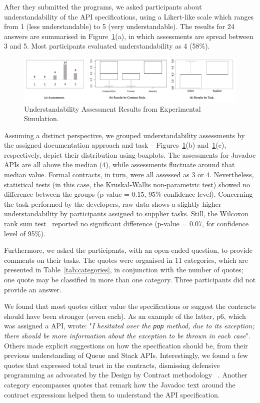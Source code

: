 After they submitted the programs, we asked participants about understandability of the API specifications, using a Likert-like scale which ranges from 1 (less understandable) to 5 (very understandable). The results for 24 answers are summarised in Figure~\ref{fig:expAll}(a), in which assessments are spread between 3 and 5. Most participants evaluated understandability as 4 (58\%).

\begin{figure}
\centering
\includegraphics[width=1\textwidth]{figs/expAllFig.png}
\caption{Understandability Assessment Results from Experimental Simulation.}
\label{fig:expAll}
\end{figure}

Assuming a distinct perspective, we grouped understandability assessments by the assigned documentation approach and task -- Figures~\ref{fig:expAll}(b) and~\ref{fig:expAll}(c), respectively, depict their distribution using boxplots.
The assessments for Javadoc APIs are all above the median ($4$), while \contractjdoc{} assessments fluctuate around that median value. Formal contracts, in turn, were all assessed as $3$ or $4$.  
Nevertheless, statistical tests (in this case, the Kruskal-Wallis non-parametric test) showed no difference between the groups (p-value = $0.15$, 95\% confidence level).
Concerning the task performed by the developers, raw data shows a slightly higher understandability by participants assigned to supplier tasks. Still, the Wilcoxon rank sum test~\cite{statistical} reported no significant difference (p-value = 0.07, for confidence level of 95\%).

Furthermore, we asked the participants, with an open-ended question, to provide comments on their tasks.
The quotes were organised in 11 categories, which are presented in Table~\ref{tab:categories}, in conjunction with the number of quotes; one quote may be classified in more than one category. Three participants did not provide an answer.

We found that most quotes either value the specifications or suggest the contracts should have been stronger (seven each). As an example of the latter, p6, which was assigned a \contractjdoc{} API, wrote: "\emph{I hesitated over the \texttt{pop} method, due to its exception; there should be more information about the exception to be thrown in each case}". 
Others made explicit suggestions on how the specification should be, from their previous understanding of Queue and Stack APIs.
Interestingly, we found a few quotes that expressed total trust in the contracts, dismissing defensive programming as advocated by the Design by Contract methodology ~\cite{dbc}.
Another category encompasses quotes that remark how the Javadoc text around the contract expressions helped them to understand the API specification. 

